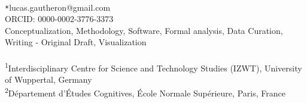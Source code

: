 \documentclass{article}
\newcommand*{\affaddr}[1]{#1}
\newcommand*{\affmark}[1][*]{\textsuperscript{#1}}
\newcommand*{\email}[1][*]{\texttt{#1}}
\begin{document}
\ \\

  \email{lucas.gautheron@gmail.com}\\ORCID: 0000-0002-3776-3373\\
 Conceptualization, Methodology, Software, Formal analysis, Data Curation, Writing - Original Draft, Visualization\\\\
 \affaddr{\affmark[1]Interdisciplinary Centre for Science and Technology Studies (IZWT), University of Wuppertal, Germany}\\
 \affaddr{\affmark[2]Département d'Études Cognitives, École Normale Supérieure, Paris, France}
 
 \pagebreak









\end{document}
